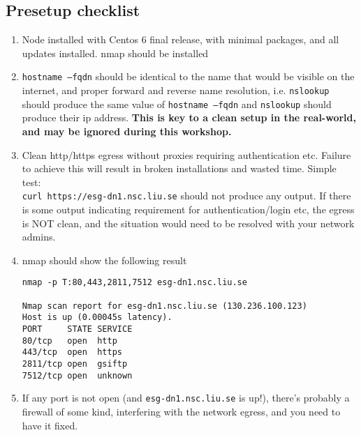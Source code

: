 \subsection{Presetup checklist}\label{checklist}

\begin{enumerate}
\def\labelenumi{\arabic{enumi}.}
\item
  Node installed with Centos 6 final release, with minimal packages, and
  all updates installed. nmap should be installed
\item
  \texttt{hostname --fqdn} should be identical to the name that would be visible
  on the internet, and proper forward and reverse name resolution,
  i.e. \texttt{nslookup} should produce the same value of \texttt{hostname --fqdn} and
  \texttt{nslookup} should produce their ip address. \textbf{This is key to a clean
  setup in the real-world, and may be ignored during this workshop.}
\item
  Clean http/https egress without proxies requiring authentication etc.
  Failure to achieve this will result in broken installations and wasted
  time. Simple test: \\
\texttt{curl https://esg-dn1.nsc.liu.se} should not produce
  any output. If there is some output indicating requirement for
  authentication/login etc, the egress is NOT clean, and the situation
  would need to be resolved with your network admins.
\item
  nmap should show the following result

\begin{verbatim}
nmap -p T:80,443,2811,7512 esg-dn1.nsc.liu.se

Nmap scan report for esg-dn1.nsc.liu.se (130.236.100.123)
Host is up (0.00045s latency).
PORT     STATE SERVICE
80/tcp   open  http
443/tcp  open  https
2811/tcp open  gsiftp
7512/tcp open  unknown
\end{verbatim}

\item If any port is not open (and \texttt{esg-dn1.nsc.liu.se} is up!), there's
probably a firewall of some kind, interfering with the network egress,
and you need to have it fixed.


\end{enumerate}
